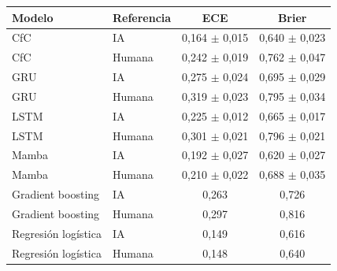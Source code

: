 \begin{tabular}{|l|l|c|c|}
\hline
\textbf{Modelo} & \textbf{Referencia} & \textbf{ECE} & \textbf{Brier} \\ \hline
CfC & IA & 0{,}164 $\pm$ 0{,}015 & 0{,}640 $\pm$ 0{,}023 \\ \hline
CfC & Humana & 0{,}242 $\pm$ 0{,}019 & 0{,}762 $\pm$ 0{,}047 \\ \hline
GRU & IA & 0{,}275 $\pm$ 0{,}024 & 0{,}695 $\pm$ 0{,}029 \\ \hline
GRU & Humana & 0{,}319 $\pm$ 0{,}023 & 0{,}795 $\pm$ 0{,}034 \\ \hline
LSTM & IA & 0{,}225 $\pm$ 0{,}012 & 0{,}665 $\pm$ 0{,}017 \\ \hline
LSTM & Humana & 0{,}301 $\pm$ 0{,}021 & 0{,}796 $\pm$ 0{,}021 \\ \hline
Mamba & IA & 0{,}192 $\pm$ 0{,}027 & 0{,}620 $\pm$ 0{,}027 \\ \hline
Mamba & Humana & 0{,}210 $\pm$ 0{,}022 & 0{,}688 $\pm$ 0{,}035 \\ \hline
Gradient boosting & IA & 0{,}263 & 0{,}726 \\ \hline
Gradient boosting & Humana & 0{,}297 & 0{,}816 \\ \hline
Regresión logística & IA & 0{,}149 & 0{,}616 \\ \hline
Regresión logística & Humana & 0{,}148 & 0{,}640 \\ \hline
\end{tabular}
